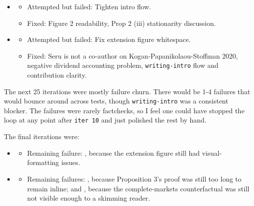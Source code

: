 \documentclass[12pt]{article}
\begin{document}
\begin{itemize}
\item {}
\begin{itemize}
\item Attempted but failed: Tighten intro flow.
\item Fixed: Figure 2 readability, Prop 2 (iii) stationarity discussion.
\end{itemize}

\item {}
\begin{itemize}
\item Attempted but failed: Fix extension figure whitespace.
\item Fixed: Seru is not a co-author on Kogan-Papanikolaou-Stoffman 2020, negative dividend accounting problem, \texttt{writing-intro} flow and contribution clarity.
\end{itemize}
\end{itemize}

The next 25 iterations were mostly failure churn. There would be 1-4 failures that would bounce around across tests, though \texttt{writing-intro} was a consistent blocker. The failures were rarely factchecks, so I feel one could have stopped the loop at any point after \texttt{iter 10} and just polished the rest by hand.

The final iterations were:

\begin{itemize}
\item {}
\begin{itemize}
\item Remaining failure: , because the extension figure still had visual-formatting issues.
\end{itemize}

\item {}
\begin{itemize}
\item Remaining failures: , because Proposition 3's proof was still too long to remain inline; and , because the complete-markets counterfactual was still not visible enough to a skimming reader.
\end{itemize}
\end{itemize}
\end{document}
